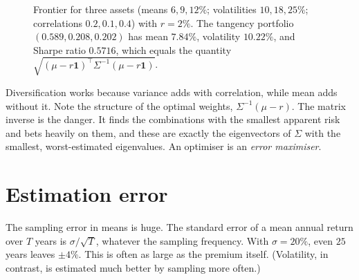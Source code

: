 \begin{figure}[t]
\centering
{}
\caption{Frontier for three assets (means $6,9,12\%$; volatilities $10,18,25\%$; correlations $0.2,0.1,0.4$) with $r=2\%$. The tangency portfolio $(0.589,0.208,0.202)$ has mean $7.84\%$, volatility $10.22\%$, and Sharpe ratio $0.5716$, which equals the quantity $\sqrt{(\mu-r\mathbf{1})^\top\Sigma^{-1}(\mu-r\mathbf{1})}$.}\label{fig:frontier}
\end{figure}

\begin{intuition}
Diversification works because variance adds with correlation, while mean adds without it. Note the structure of the optimal weights, $\Sigma^{-1}(\mu-r)$. The matrix inverse is the danger. It finds the combinations with the smallest apparent risk and bets heavily on them, and these are exactly the eigenvectors of $\Sigma$ with the smallest, worst-estimated eigenvalues. An optimiser is an \emph{error maximiser}.
\end{intuition}

\section{Estimation error}

The sampling error in means is huge. The standard error of a mean annual return over $T$ years is $\sigma/\sqrt T$, whatever the sampling frequency. With $\sigma=20\%$, even $25$ years leaves $\pm4\%$. This is often as large as the premium itself. (Volatility, in contrast, is estimated much better by sampling more often.)


